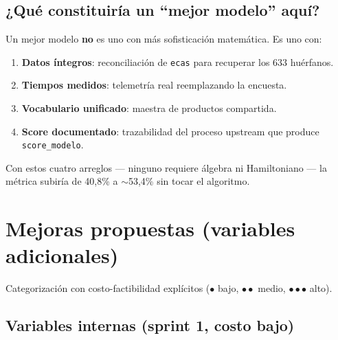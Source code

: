 \documentclass[11pt,a4paper]{article}
\begin{document}
\subsection{¿Qué constituiría un ``mejor modelo'' aquí?}

\begin{decisionbox}
Un mejor modelo \textbf{no} es uno con más sofisticación matemática. Es uno con:

\begin{enumerate}
    \item \textbf{Datos íntegros}: reconciliación de \texttt{ecas} para recuperar los 633 huérfanos.
    \item \textbf{Tiempos medidos}: telemetría real reemplazando la encuesta.
    \item \textbf{Vocabulario unificado}: maestra de productos compartida.
    \item \textbf{Score documentado}: trazabilidad del proceso upstream que produce \texttt{score\_modelo}.
\end{enumerate}

Con estos cuatro arreglos --- ninguno requiere álgebra ni Hamiltoniano --- la métrica subiría de 40,8\% a $\sim$53,4\% sin tocar el algoritmo.
\end{decisionbox}

\section{Mejoras propuestas (variables adicionales)}

Categorización con costo-factibilidad explícitos ($\bullet$ bajo, $\bullet\bullet$ medio, $\bullet\bullet\bullet$ alto).

\subsection{Variables internas (sprint 1, costo bajo)}
\end{document}
